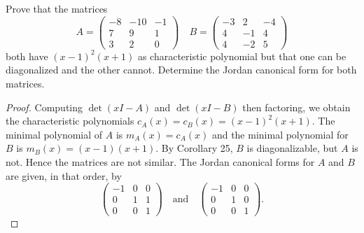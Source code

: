 \documentclass[10pt]{amsart}
\begin{document}
\begin{thm}
  \label{Ex4}
  Prove that the matrices 
  $$
  A = \begin{pmatrix}
    -8 & -10 & -1\\
    7 & 9 & 1\\
    3 & 2 & 0
  \end{pmatrix}
  \quad
  B = \begin{pmatrix}
    -3 & 2 & -4\\
    4 & -1 & 4\\
    4 & -2 & 5
  \end{pmatrix}
  $$
  both have $(x-1)^2(x+1)$ as characteristic polynomial but that one can be diagonalized and the other cannot.
  Determine the Jordan canonical form for both matrices.
  \begin{proof}
    Computing $\det(xI - A)$ and $\det(xI - B)$ then factoring, we obtain the characteristic polynomials $c_A(x) = c_B(x) = (x-1)^2(x+1)$.
    The minimal polynomial of $A$ is $m_A(x) = c_A(x)$ and the minimal polynomial for $B$ is $m_B(x) = (x-1)(x+1)$.
    By Corollary 25, $B$ is diagonalizable, but $A$ is not.  
    Hence the matrices are not similar.
    The Jordan canonical forms for $A$ and $B$ are given, in that order, by
    $$
    \begin{pmatrix}
      -1 & 0 & 0\\
      0 & 1 & 1\\
      0 & 0 & 1
    \end{pmatrix}
    \quad \text{and} \quad
    \begin{pmatrix}
      -1 & 0 & 0\\
      0 & 1 & 0\\
      0 & 0 & 1
    \end{pmatrix}.
    $$
  \end{proof}
\end{thm}
\end{document}
